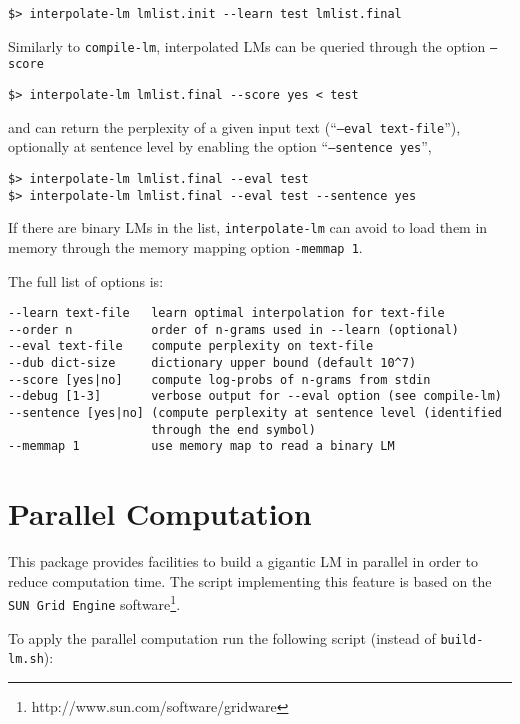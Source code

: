 \documentclass[11pt]{article}
\begin{document}
\begin{verbatim}
$> interpolate-lm lmlist.init --learn test lmlist.final
\end{verbatim}


\noindent
Similarly to {\tt compile-lm}, interpolated LMs can be queried through the option {\tt --score}

\begin{verbatim}
$> interpolate-lm lmlist.final --score yes < test
\end{verbatim}

\noindent
and can return the perplexity of a given input text (``{\tt --eval text-file}''), optionally  at sentence level  by enabling the option ``{\tt --sentence yes}'',

\begin{verbatim}
$> interpolate-lm lmlist.final --eval test 
$> interpolate-lm lmlist.final --eval test --sentence yes
\end{verbatim}

\bigskip
\noindent
If there are binary LMs in the list,  {\tt interpolate-lm} can avoid to load them in memory through the memory 
mapping option {\tt -memmap 1}.


\noindent
The full list of options is:

\begin{verbatim}
--learn text-file   learn optimal interpolation for text-file
--order n           order of n-grams used in --learn (optional)
--eval text-file    compute perplexity on text-file
--dub dict-size     dictionary upper bound (default 10^7)
--score [yes|no]    compute log-probs of n-grams from stdin
--debug [1-3]       verbose output for --eval option (see compile-lm)
--sentence [yes|no] (compute perplexity at sentence level (identified
                    through the end symbol)
--memmap 1          use memory map to read a binary LM
\end{verbatim}
 

 
\newpage
\section{Parallel Computation}
This package provides facilities to build a gigantic LM in parallel in order to reduce computation time.
The script implementing this feature is based on the {\tt SUN Grid Engine} software\footnote{http://www.sun.com/software/gridware}.

\noindent
To apply the parallel computation run the following script (instead of {\tt build-lm.sh}):
\end{document}
